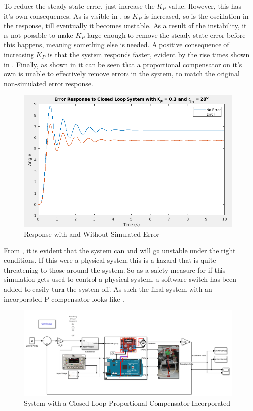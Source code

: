 \documentclass[a4paper, 11pt, compsoc]{IEEEtran}
\begin{document}
			\par
			To reduce the steady state error, just increase the $K_P$ value. However, this has it's own consequences. As is visible in , as $K_P$ is increased, so is the oscillation in the response, till eventually it becomes unstable. As a result of the instability, it is not possible to make $K_P$ large enough to remove the steady state error before this happens, meaning something else is needed. A positive consequence of increasing $K_P$ is that the system responds faster, evident by the rise times shown in . Finally, as shown in  it can be seen that a proportional compensator on it's own is unable to effectively remove errors in the system, to match the original non-simulated error response.
			\begin{figure}[!ht]
				\centering
				\includegraphics[width=\columnwidth]{lab5Error.png}
				\caption{Response with and Without Simulated Error}
				\label{fig:lab5Error}
			\end{figure}
			\par
			From , it is evident that the system can and will go unstable under the right conditions. If this were a physical system this is a hazard that is quite threatening to those around the system. So as a safety measure for if this simulation gets used to control a physical system, a software switch has been added to easily turn the system off. As such the final system with an incorporated P compensator looks like .

			\begin{figure}[!ht]
				\centering
				\includegraphics[width=\columnwidth]{lab5Sys.png}
				\caption{System with a Closed Loop Proportional Compensator Incorporated}
				\label{fig:lab5Sys}
			\end{figure}
\end{document}
